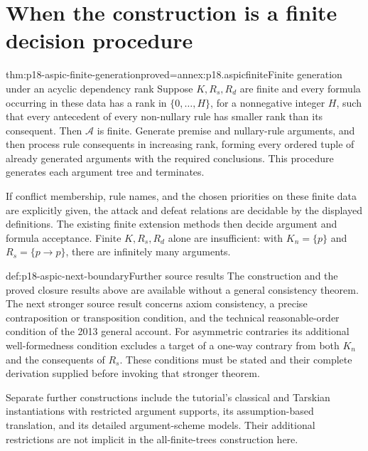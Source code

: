 \section{When the construction is a finite decision procedure}

\begin{hbtheorem}{thm:p18-aspic-finite-generation}{proved=annex:p18.aspicfinite}{Finite generation under an acyclic dependency rank}
Suppose \(K,R_s,R_d\) are finite and every formula occurring in these data
has a rank in \(\{0,\ldots,H\}\), for a nonnegative integer \(H\),
such that every antecedent of every
non-nullary rule has smaller rank than its consequent.
Then \(\mathcal A\) is finite. Generate premise and nullary-rule arguments,
and then process rule consequents in increasing rank, forming every ordered
tuple of already generated arguments with the required conclusions.
This procedure generates each argument tree and terminates.

If conflict membership, rule names, and the chosen priorities on these finite
data are explicitly given, the attack and defeat relations are decidable by
the displayed definitions. The existing finite extension methods then decide
argument and formula acceptance. Finite \(K,R_s,R_d\) alone are insufficient:
with \(K_n=\{p\}\) and \(R_s=\{p\to p\}\), there are infinitely many arguments.
\end{hbtheorem}

\begin{proofboundary}{def:p18-aspic-next-boundary}{Further source results}
The construction and the proved closure results above are available without
a general consistency theorem. The next stronger source result concerns
axiom consistency, a precise contraposition or transposition condition,
and the technical reasonable-order condition of the 2013 general account.
For asymmetric contraries its additional well-formedness condition excludes
a target of a one-way contrary from both \(K_n\) and the consequents of
\(R_s\). These conditions must be stated and their complete derivation
supplied before invoking that stronger theorem.

Separate further constructions include the tutorial's classical and Tarskian
instantiations with restricted argument supports, its assumption-based
translation, and its detailed argument-scheme models. Their additional
restrictions are not implicit in the all-finite-trees construction here.
\end{proofboundary}
